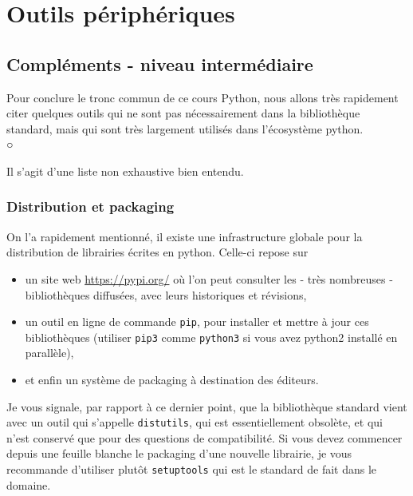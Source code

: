     \hypertarget{outils-puxe9riphuxe9riques}{%
\section{Outils périphériques}\label{outils-puxe9riphuxe9riques}}

    \hypertarget{compluxe9ments---niveau-intermuxe9diaire}{%
\subsection{Compléments - niveau
intermédiaire}\label{compluxe9ments---niveau-intermuxe9diaire}}

    Pour conclure le tronc commun de ce cours Python, nous allons très
rapidement citer quelques outils qui ne sont pas nécessairement dans la
bibliothèque standard, mais qui sont très largement utilisés dans
l'écosystème python.\\○

Il s'agit d'une liste non exhaustive bien entendu.

    \hypertarget{distribution-et-packaging}{%
\subsubsection{Distribution et
packaging}\label{distribution-et-packaging}}

    On l'a rapidement mentionné, il existe une infrastructure globale pour
la distribution de librairies écrites en python. Celle-ci repose sur

\begin{itemize}
\tightlist
\item
  un site web \url{https://pypi.org/} où l'on peut consulter les - très
  nombreuses - bibliothèques diffusées, avec leurs historiques et
  révisions,
\item
  un outil en ligne de commande \texttt{pip}, pour installer et mettre à
  jour ces bibliothèques (utiliser \texttt{pip3} comme \texttt{python3}
  si vous avez python2 installé en parallèle),
\item
  et enfin un système de packaging à destination des éditeurs.
\end{itemize}

Je vous signale, par rapport à ce dernier point, que la bibliothèque
standard vient avec un outil qui s'appelle \texttt{distutils}, qui est
essentiellement obsolète, et qui n'est conservé que pour des questions
de compatibilité. Si vous devez commencer depuis une feuille blanche le
packaging d'une nouvelle librairie, je vous recommande d'utiliser plutôt
\texttt{setuptools} qui est le standard de fait dans le domaine.\\

